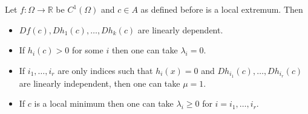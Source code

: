 \begin{theorem}
	Let $f: \Omega \to \mathbb{R}$ be $C^1(\Omega)$ and $c \in A$ as defined before is a local extremum. Then
	\begin{itemize}
		\item $Df(c), Dh_1(c), \ldots,Dh_k(c)$ are linearly dependent.
		\item If $h_i(c)>0$ for some $i$ then one can take $\lambda_i = 0$.
		\item If $i_1, \ldots, i_r$ are only indices such that $h_i(x) = 0$ and $Dh_{i_1}(c), \ldots, Dh_{i_r}(c)$ are linearly independent, then one can take $\mu = 1$.
		\item If $c$ is a local minimum then one can take $\lambda_i\ge 0$ for $i = i_1, \ldots, i_r$.
	\end{itemize}
\end{theorem}
